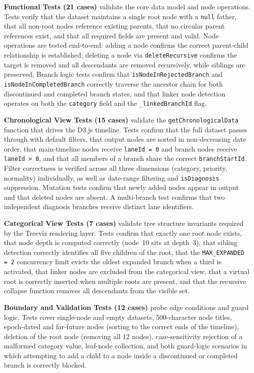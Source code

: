 \textbf{Functional Tests (21 cases)} validate the core data model and node
operations. Tests verify that the dataset maintains a single root node with a
\texttt{null} father, that all non-root nodes reference existing parents, that
no circular parent references exist, and that all required fields are present
and valid. Node operations are tested end-to-end: adding a node confirms the
correct parent-child relationship is established; deleting a node via
\texttt{deleteRecursive} confirms the target is removed and all descendants are
removed recursively, while siblings are preserved. Branch logic tests confirm
that \texttt{isNodeInRejectedBranch} and \texttt{isNodeInCompletedBranch}
correctly traverse the ancestor chain for both discontinued and completed
branch states, and that linker node detection operates on both the
\texttt{category} field and the \texttt{\_linkedBranchId} flag.

\textbf{Chronological View Tests (15 cases)} validate the
\texttt{getChronologicalData} function that drives the D3.js timeline. Tests
confirm that the full dataset passes through with default filters, that output
nodes are sorted in non-decreasing date order, that main-timeline nodes receive
\texttt{laneId = 0} and branch nodes receive \texttt{laneId > 0}, and that all
members of a branch share the correct \texttt{branchStartId}. Filter
correctness is verified across all three dimensions (category, priority,
normality) individually, as well as date-range filtering and
\texttt{isDiagnosis} suppression. Mutation tests confirm that newly added nodes
appear in output and that deleted nodes are absent. A multi-branch test
confirms that two independent diagnosis branches receive distinct lane
identifiers.

\textbf{Categorical View Tests (7 cases)} validate tree structure invariants
required by the Treeviz rendering layer. Tests confirm that exactly one root
node exists, that node depth is computed correctly (node~10 sits at depth~3),
that sibling detection correctly identifies all five children of the root, that
the \texttt{MAX\_EXPANDED = 2} concurrency limit evicts the oldest expanded
branch when a third is activated, that linker nodes are excluded from the
categorical view, that a virtual root is correctly inserted when multiple roots
are present, and that the recursive collapse function removes all descendants
from the visible set.

\textbf{Boundary and Validation Tests (12 cases)} probe edge conditions and
guard logic. Tests cover single-node and empty datasets, 500-character node
titles, epoch-dated and far-future nodes (sorting to the correct ends of the
timeline), deletion of the root node (removing all 12 nodes), case-sensitivity
rejection of a malformed category value, leaf-node collection, and both
guard-logic scenarios in which attempting to add a child to a node inside a
discontinued or completed branch is correctly blocked.

